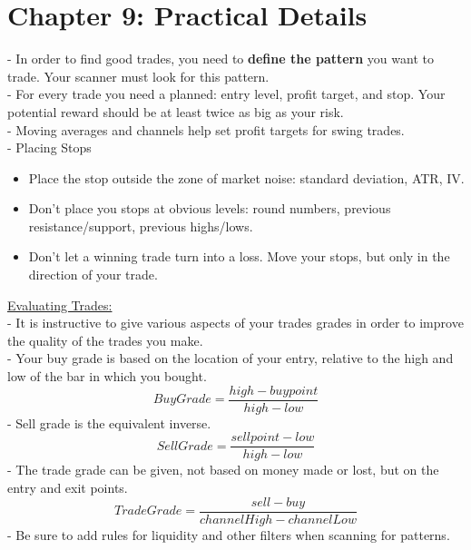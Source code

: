 \documentclass[12pt,fullpage]{article}
\begin{document}
\section*{Chapter 9: Practical Details}
- In order to find good trades, you need to \textbf{define the pattern} you want to trade. Your scanner must look for this pattern.\\
- For every trade you need a planned: entry level, profit target, and stop. Your potential reward should be at least twice as big as your risk.\\
- Moving averages and channels help set profit targets for swing trades.\\
- Placing Stops
\begin{itemize}
   \itemsep0em
   \item Place the stop outside the zone of market noise: standard deviation, ATR, IV.
   \item Don't place you stops at obvious levels: round numbers, previous resistance/support, previous highs/lows.
   \item Don't let a winning trade turn into a loss. Move your stops, but only in the direction of your trade.
\end{itemize}
\underline{Evaluating Trades:}\\
- It is instructive to give various aspects of your trades grades in order to improve the quality of the trades you make.\\
- Your buy grade is based on the location of your entry, relative to the high and low of the bar in which you bought.\\
\[Buy Grade = \frac{high - buypoint}{high - low}\]
- Sell grade is the equivalent inverse.\\
\[Sell Grade = \frac{sell point - low}{high - low}\]
- The trade grade can be given, not based on money made or lost, but on the entry and exit points.\\
\[Trade Grade = \frac{sell - buy}{channelHigh - channelLow}\]
- Be sure to add rules for liquidity and other filters when scanning for patterns.\\
\end{document}

